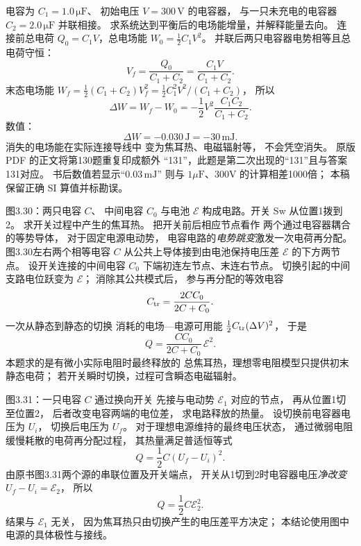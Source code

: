电容为 $C_1=1.0\,\mathrm{\mu F}$、
初始电压 $V=300\,\mathrm V$ 的电容器，
与一只未充电的电容器
$C_2=2.0\,\mathrm{\mu F}$ 并联相接。
求系统达到平衡后的电场能增量，并解释能量去向。
\exsolution
连接前总电荷
$Q_0=C_1V$，总电场能
$W_0=\frac12C_1V^2$。
并联后两只电容器电势相等且总电荷守恒：
\[
V_f=\frac{Q_0}{C_1+C_2}=\frac{C_1V}{C_1+C_2}.
\]
末态电场能
$W_f=\frac12(C_1+C_2)V_f^2
=\frac12 C_1^2V^2/(C_1+C_2)$，
所以
\[
\boxed{\Delta W=W_f-W_0
=-\frac12V^2\frac{C_1C_2}{C_1+C_2}}.
\]
数值：
\[
\boxed{\Delta W=-0.030\,\mathrm J=-30\,\mathrm{mJ}}.
\]
消失的电场能在实际连接导线中
变为焦耳热、电磁辐射等，
不会凭空消失。
\excheck 原版 PDF 的正文将第130题重复印成额外
“131”，此题是第二次出现的“131”且与答案131对应。
书后数值若显示“$0.03\,\mathrm{mJ}$”
则与 $1\mu\mathrm F$、300V 的计算相差1000倍；
本稿保留正确 SI 算值并标勘误。

图3.30：两只电容 $C$、
中间电容 $C_0$ 与电池 $\mathcal E$
构成电路。开关 Sw 从位置1拨到2。
求开关过程中产生的焦耳热。
\exsolution
把开关前后相应节点看作
两个通过电容器耦合的等势导体，
对于固定电源电动势，
电容电路的\emph{电势跳变}激发一次电荷再分配。
图3.30左右两个相等电容 $C$
从公共上导体接到由电池保持电压差
$\mathcal E$ 的下方两节点。
设开关连接的中间电容 $C_0$
下端初连左节点、末连右节点。
切换引起的中间支路电位跃变为 $\mathcal E$；
消除其公共模式后，
参与再分配的等效电容
\[
C_{\rm tr}=\frac{2CC_0}{2C+C_0}.
\]
一次从静态到静态的切换
消耗的电场—电源可用能
$\frac12C_{\rm tr}(\Delta V)^2$，
于是
\[
\boxed{Q=\frac{CC_0}{2C+C_0}\,\mathcal E^2}.
\]
\excheck 本题求的是有微小实际电阻时最终释放的
总焦耳热，理想零电阻模型只提供初末静态电荷；
若开关瞬时切换，过程可含瞬态电磁辐射。

图3.31：一只电容 $C$ 通过换向开关
先接与电动势 $\mathcal E_1$ 对应的节点，
再从位置1切至位置2，
后者改变电容两端的电位差，
求电路释放的热量。
\exsolution
设切换前电容器电压为 $U_i$，
切换后电压为 $U_f$。
对于理想电源维持的最终电压状态，
通过微弱电阻缓慢耗散的电荷再分配过程，
其热量满足普适恒等式
\[
Q=\frac12C(U_f-U_i)^2.
\]
由原书图3.31两个源的串联位置及开关端点，
开关从1切到2时电容器电压\emph{净改变}
$U_f-U_i=\mathcal E_2$，
所以
\[
\boxed{Q=\frac12C\mathcal E_2^2}.
\]
\excheck 结果与 $\mathcal E_1$ 无关，
因为焦耳热只由切换产生的电压差平方决定；
本结论使用图中电源的具体极性与接线。


